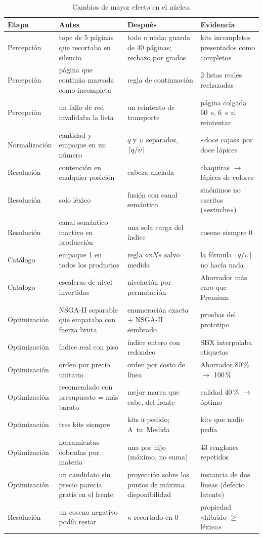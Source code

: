 \begin{table}[htbp]
\centering\small
\caption{Cambios de mayor efecto en el núcleo.}
\label{tab:evolucion-resumen}
\begin{tabular}{@{}L{2.2cm}L{4.6cm}L{4.2cm}L{3.6cm}@{}}
\toprule
Etapa & Antes & Después & Evidencia \\
\midrule
Percepción & tope de 5 páginas que recortaba en silencio & todo o nada; guarda de 40 páginas; rechazo por grados & kits incompletos presentados como completos \\
Percepción & página que continúa marcada como incompleta & regla de continuación & 2 listas reales rechazadas \\
Percepción & un fallo de red invalidaba la lista & un reintento de transporte & página colgada 60~s, 6~s al reintentar \\
Normalización & cantidad y empaque en un número & $q$ y $\upsilon$ separados, $\left\lceil q/\upsilon \right\rceil$ & «doce cajas» por doce lápices \\
Resolución & contención en cualquier posición & cabeza anclada & chaquiras $\to$ lápices de colores \\
Resolución & solo léxico & fusión con canal semántico & sinónimos no escritos («estuche») \\
Resolución & canal semántico inactivo en producción & una sola carga del índice & coseno siempre 0 \\
Catálogo & empaque 1 en todos los productos & regla «x$N$» salvo medida & la fórmula $\left\lceil q/\upsilon \right\rceil$ no hacía nada \\
Catálogo & escaleras de nivel invertidas & nivelación por permutación & Ahorrador más caro que Premium \\
Optimización & NSGA-II separable que empataba con fuerza bruta & enumeración exacta + NSGA-II sembrado & pruebas del prototipo \\
Optimización & índice real con piso & índice entero con redondeo & SBX interpolaba etiquetas \\
Optimización & orden por precio unitario & orden por costo de línea & Ahorrador 80\,\% $\to$ 100\,\% \\
Optimización & recomendado con presupuesto = más barato & mejor marca que cabe, del frente & calidad 40\,\% $\to$ óptimo \\
Optimización & tres kits siempre & kits a pedido; A~tu~Medida & kits que nadie pedía \\
Optimización & herramientas cobradas por materia & una por hijo (máximo, no suma) & 43 renglones repetidos \\
Optimización & un candidato sin precio parecía gratis en el frente & proyección sobre los puntos de máxima disponibilidad & instancia de dos líneas (defecto latente) \\
Resolución & un coseno negativo podía restar & $\kappa$ recortado en 0 & propiedad «híbrido $\geq$ léxico» \\
\bottomrule
\end{tabular}
\end{table}

